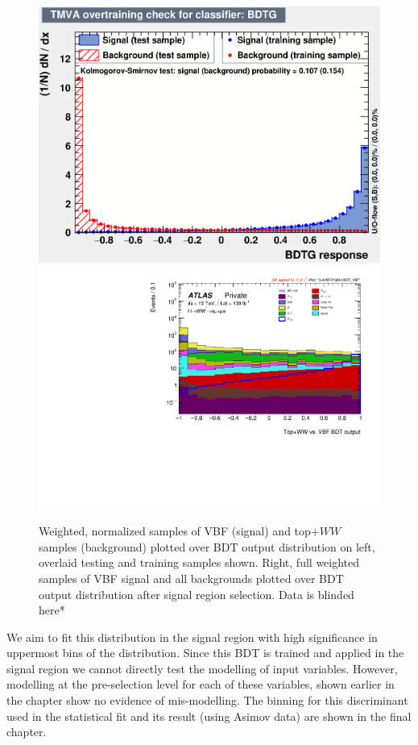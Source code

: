 \begin{figure}[!htbp]
\centering
  \includegraphics[width=.45\linewidth]{Pictures/VBFvsWW+Top/overtrain_BDTG.eps}
  \includegraphics[width=.35\linewidth]{Pictures/run2-emme-CutVBFDYjjMin-BDT_VBF-log.pdf}
\caption{Weighted, normalized samples of VBF (signal) and top$+WW$ samples (background) plotted over BDT output distribution on left, overlaid testing and training samples shown. Right, full weighted samples of VBF signal and all backgrounds plotted over BDT output distribution after signal region selection. Data is blinded here*}
\label{fig:SRBDTresult}
\end{figure}

We aim to fit this distribution in the signal region with high significance in uppermost bins of the distribution. Since this BDT is trained and applied in the signal region we cannot directly test the modelling of input variables. However, modelling at the pre-selection level for each of these variables, shown earlier in the chapter show no evidence of mis-modelling. The binning for this discriminant used in the statistical fit and its result (using Asimov data) are shown in the final chapter. 
